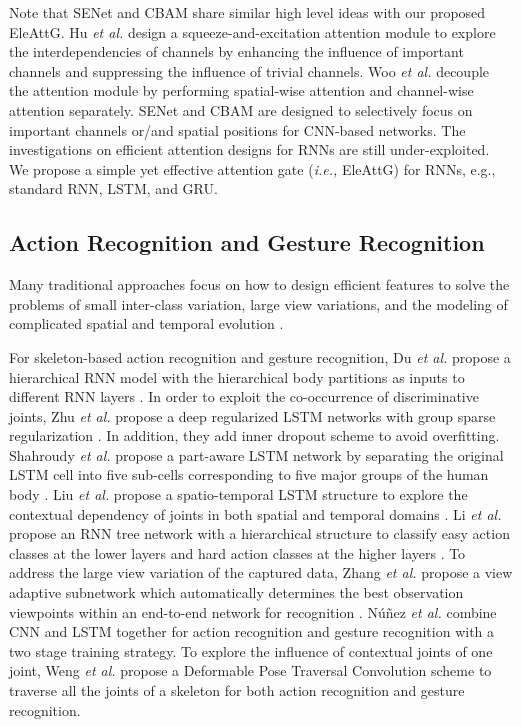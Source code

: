 \documentclass[journal]{IEEEtran}
\begin{document}
Note that SENet \cite{hu2018squeeze} and CBAM \cite{woo2018cbam} share similar high level ideas with our proposed EleAttG. Hu {\it et al.} design a squeeze-and-excitation attention module to explore the interdependencies of channels  by enhancing the influence of important channels and suppressing the influence of trivial channels. Woo {\it et al.} decouple the attention module by performing spatial-wise attention and channel-wise attention separately. SENet and CBAM are designed to selectively focus on important channels or/and spatial positions for CNN-based networks. The investigations on efficient attention designs for RNNs are still under-exploited. We propose a simple yet effective attention gate ({\it i.e.,} EleAttG) for RNNs, e.g., standard RNN, LSTM, and GRU.

\subsection {Action Recognition and Gesture Recognition}
\label{subsec:action}
Many traditional approaches focus on how to design efficient features to solve the problems of small inter-class variation, large view variations, and the modeling of complicated spatial and temporal evolution  \cite{wang2013action,wang2014cross,vemulapalli2014human,xia2012view,wang2016graph, de2016skeleton}. 

For skeleton-based action recognition and gesture recognition, Du {\it et al.} propose a hierarchical RNN model with the hierarchical body partitions as inputs to different RNN layers \cite{du2015hierarchical}. In order to exploit the co-occurrence of discriminative joints, Zhu {\it et al.} propose a deep regularized LSTM networks with group sparse regularization \cite{zhu2016co}. In addition, they add inner dropout scheme to avoid overfitting. Shahroudy {\it et al.} propose a part-aware LSTM network by separating the original LSTM cell into five sub-cells corresponding to five major groups of the human body \cite{Shahroudy_2016_CVPR}. Liu {\it et al.} propose a spatio-temporal LSTM structure to explore the contextual dependency of joints in both spatial and temporal domains \cite{liu2016spatio}. Li {\it et al.} propose an RNN tree network with a hierarchical structure to classify easy action classes at the lower layers and hard action classes at the higher layers \cite{li2017adaptive}. To address the large view variation of the captured data, Zhang {\it et al.} propose a view adaptive subnetwork which automatically determines the best observation viewpoints within an end-to-end network for recognition \cite{zhang2017view, zhang2019view}. N{\'u}{\~n}ez {\it et al.} \cite{nunez2018convolutional} combine CNN and LSTM together for action recognition and gesture recognition with a two stage training strategy. To explore the influence of contextual joints of one joint, Weng {\it et al.} \cite{weng2018deformable} propose a Deformable Pose Traversal Convolution scheme to traverse all the joints of a skeleton for both action recognition and gesture recognition. 
\end{document}
